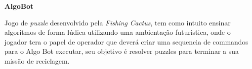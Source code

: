 \item \textbf{AlgoBot}

Jogo de \textit{puzzle} desenvolvido pela \textit{Fishing Cactus}, tem como
intuito ensinar algoritmos de forma lúdica utilizando uma ambientação
futuristica, onde o jogador tera o papel de operador que deverá criar uma
sequencia de commandos para o Algo Bot executar, seu objetivo é resolver
puzzles para terminar a sua missão de reciclagem. \cite{AlgoBotSteam}


